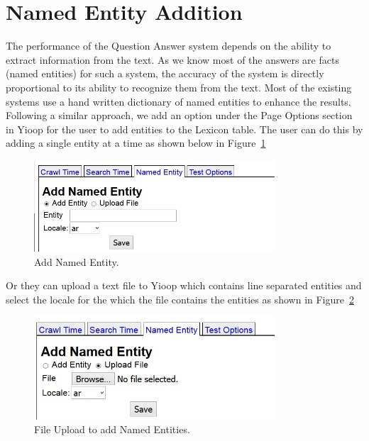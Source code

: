 \section{Named Entity Addition}
The performance of the Question Answer system depends on the ability to extract information from the text. As we know most of the answers are facts (named entities) for such a system, the accuracy of the system is directly proportional to its ability to recognize them from the text. Most of the existing systems use a hand written dictionary of named entities to enhance the results. Following a similar approach, we add an option under the Page Options section in Yioop for the user to add entities to the Lexicon table. The user can do this by adding a single entity at a time as shown below in Figure~\ref{fig:named_entity_manual} 

\begin{figure}[htb]
\centering
\includegraphics[width=0.8\textwidth]{images/named_entity_manual.jpg}
\caption{Add Named Entity.} 
\label{fig:named_entity_manual}
\end{figure}

Or they can upload a text file to Yioop which contains line separated entities and select the locale for the which the file contains the entities as shown in Figure~\ref{fig:named_entity_file} 

\begin{figure}[htb]
\centering
\includegraphics[width=0.8\textwidth]{images/named_entity_file.jpg}
\caption{File Upload to add Named Entities.} 
\label{fig:named_entity_file}
\end{figure}

